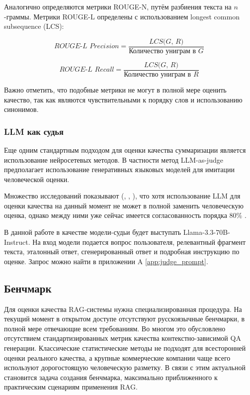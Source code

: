 Аналогично определяются метрики ROUGE-N, путём разбиения текста на $n$-граммы. Метрики ROUGE-L определены с использованием longest common subsequence (LCS):

\begin{equation}
    \textit{ROUGE-L Precision} = \frac{\textit{LCS($G$, $R$)}}{\textit{Количество униграм в G}}
\end{equation}

\begin{equation}
    \textit{ROUGE-L Recall} = \frac{\textit{LCS($G$, $R$)}}{\textit{Количество униграм в R}}
\end{equation}

Важно отметить, что подобные метрики не могут в полной мере оценить качество, так как являются чувствительными к порядку слов и использованию синонимов.


\subsubsection{LLM как судья}
\label{subsec:llm_judge} 

Еще одним стандартным подходом для оценки качества суммаризации является использование нейросетевых методов. В частности метод LLM-as-judge предполагает использование генеративных языковых моделей для имитации человеческой оценки.

Множество исследований показывают (\cite{LLM-as-judge-1}, \cite{LLM-as-judge-2}, \cite{LLM-as-judge-3}), что хотя использование LLM для оценки качества на данный момент не может в полной заменить человеческую оценка, однако между ними уже сейчас имеется согласованность порядка 80\% \cite{LLM-as-judge-1}.  

В данной работе в качестве модели-судьи будет выступать Llama-3.3-70B-Instruct. На вход модели подается вопрос пользователя, релевантный фрагмент текста, эталонный ответ, сгенерированный ответ и подробная инструкцию по оценке. Запрос можно найти в приложении A \ref{app:judge_prompt}.

\subsection{Бенчмарк}
\label{subsec:benchmark_theory} 

Для оценки качества RAG-системы нужна специализированная процедура. На текущий момент в открытом доступе отсутствуют русскоязычные бенчмарки, в полной мере отвечающие всем требованиям. Во многом это обусловлено отсутствием стандартизированных метрик качества контекстно-зависимой QA генерации. Классические статистические методы не подходят для всесторонней оценки реального качества, а крупные коммерческие компании чаще всего используют дорогостоящую человеческую разметку. В связи с этим актуальной становится задача создания бенчмарка,  максимально приближенного к практическим сценариям применения RAG.

